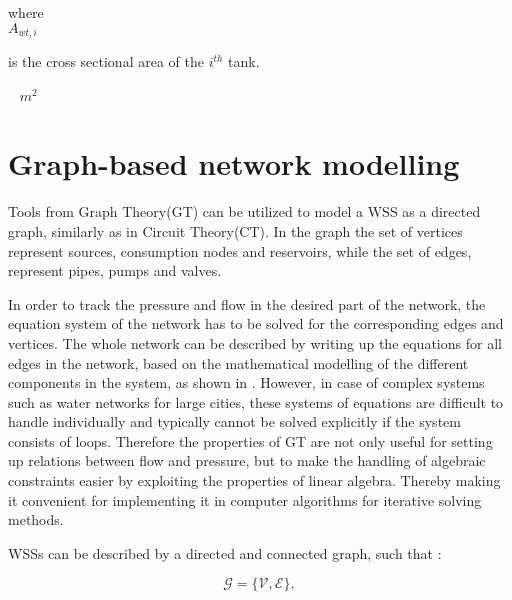  \begin{minipage}[t]{0.20\textwidth}
where\\
\hspace*{8mm} $A_{wt,i}$ 
\end{minipage}
\begin{minipage}[t]{0.68\textwidth}
\vspace*{2mm}
is the cross sectional area of the $i^{th}$ tank.
\end{minipage}
\begin{minipage}[t]{0.10\textwidth}
\vspace*{2mm}
\textcolor{White}{te}$\unit{m^2}$
\end{minipage} 



\section{Graph-based network modelling}
\label{graph_based_network_modelling}

Tools from Graph Theory(GT) can be utilized to model a WSS as a directed graph, similarly as in Circuit Theory(CT). In the graph the set of vertices represent sources, consumption nodes and reservoirs, while the set of edges, represent pipes, pumps and valves. 

In order to track the pressure and flow in the desired part of the network, the equation system of the network has to be solved for the corresponding edges and vertices. The whole network can be described by writing up the equations for all edges in the network, based on the mathematical modelling of the different components in the system, as shown in . However, in case of complex systems such as water networks for large cities, these systems of equations are difficult to handle individually and typically cannot be solved explicitly if the system consists of loops. Therefore the properties of GT are not only useful for setting up relations between flow and pressure, but to make the handling of algebraic constraints easier by exploiting the properties of linear algebra. Thereby making it convenient for implementing it in computer algorithms for iterative solving methods.  

WSSs can be described by a directed and connected graph, such that \cite{graph_intro}: 

\begin{equation}
  \label{Numberofchords}
  \mathcal{G} = \{\mathcal{V}, \mathcal{E} \} ,
\end{equation}

